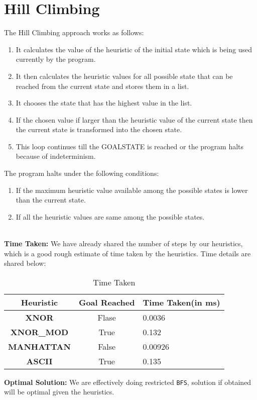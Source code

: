 \documentclass[a4paper,10pt,reqno,oneside]{amsart}
\begin{document}
\section{Hill Climbing}
The Hill Climbing approach works as follows:
\begin{enumerate}
    \item It calculates the value of the heuristic of the initial state which is being used currently by the program.
    \item It then calculates the heuristic values for all possible state that can be reached from the current state and stores them in a list.
    \item It chooses the state that has the highest value in the list.
    \item If the chosen value if larger than the heuristic value of the current state then the current state is transformed into the chosen state.
    \item This loop continues till the GOALSTATE is reached or the program halts because of indeterminism.
\end{enumerate}
The program halts under the following conditions:
\begin{enumerate}
    \item If the maximum heuristic value available among the possible states is lower than the current state.
    \item If all the heuristic values are same among the possible states.
\end{enumerate}
\\
\textbf{Time Taken:} We have already shared the number of steps by our heuristics, which is a good rough estimate of
time taken by the heuristics. Time details are shared below:

\begin{table}[h]
    \begin{tabular}{|c|c|l|}
    \hline
    \textbf{Heuristic} & \textbf{Goal Reached} & \textbf{Time Taken(in ms)} \\ \hline
    \textbf{XNOR}      & Flase                 & 0.0036                     \\ \hline
    \textbf{XNOR\_MOD} & True                  & 0.132                      \\ \hline
    \textbf{MANHATTAN} & False                 & 0.00926                    \\ \hline
    \textbf{ASCII}     & True                  & 0.135                      \\ \hline
    \end{tabular}
    \caption{Time Taken}
\end{table}

\textbf{Optimal Solution:}  We are effectively doing restricted \texttt{BFS}, solution if obtained will be optimal
given the heuristics.
\end{document}
